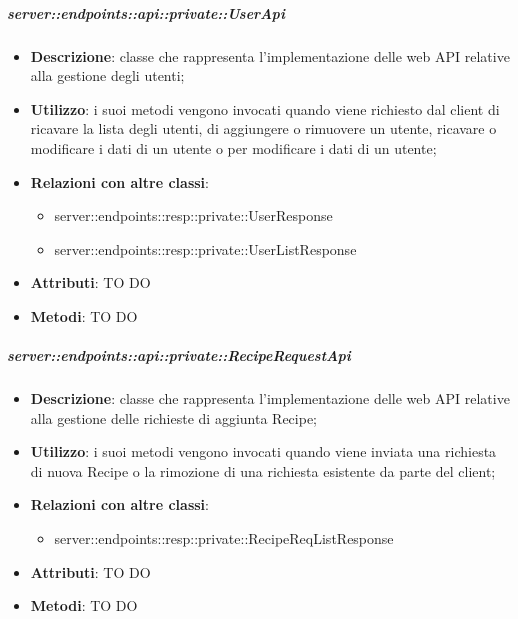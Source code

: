     \subparagraph{server::endpoints::api::private::UserApi} %
    \label{subp:bdsm_app_server_endpoints_api_private_userapi}
    \begin{itemize}
      \item \textbf{Descrizione}: classe che rappresenta l'implementazione delle web API relative alla gestione degli utenti;
      \item \textbf{Utilizzo}: i suoi metodi vengono invocati quando viene richiesto dal client di ricavare la lista degli utenti, di aggiungere o rimuovere un utente, ricavare o modificare i dati di un utente o per modificare i dati di un utente;
      \item \textbf{Relazioni con altre classi}:
        \begin{itemize}
          \item server::endpoints::resp::private::UserResponse
          \item server::endpoints::resp::private::UserListResponse
        \end{itemize}
		\item \textbf{Attributi}: TO DO
		\item \textbf{Metodi}: TO DO
      \end{itemize}

    \subparagraph{server::endpoints::api::private::RecipeRequestApi} %
    \label{subp:bdsm_app_server_endpoints_api_private::reciperequestapi}
    \begin{itemize}
      \item \textbf{Descrizione}: classe che rappresenta l'implementazione delle web API relative alla gestione delle richieste di aggiunta Recipe;
      \item \textbf{Utilizzo}: i suoi metodi vengono invocati quando viene inviata una richiesta di nuova Recipe o la rimozione di una richiesta esistente da parte del client;
      \item \textbf{Relazioni con altre classi}:
        \begin{itemize}
          \item server::endpoints::resp::private::RecipeReqListResponse
        \end{itemize}
		\item \textbf{Attributi}: TO DO
		\item \textbf{Metodi}: TO DO
      \end{itemize}

